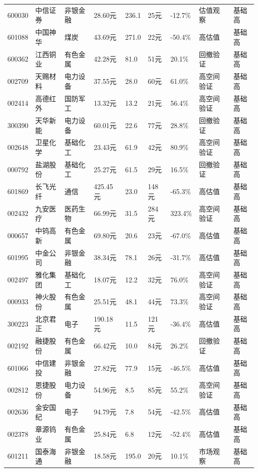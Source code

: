 \begin{longtable}{L{1.0cm}L{1.55cm}L{1.4cm}R{1.0cm}R{1.0cm}R{1.0cm}R{1.05cm}L{3.6cm}L{0.9cm}}
600030 & 中信证券 & 非银金融 & 28.60元 & 236.1 & 25元 & -12.7\% & 估值观察 & 基础高 \\
601088 & 中国神华 & 煤炭 & 43.69元 & 271.0 & 22元 & -50.4\% & 高估值 & 基础高 \\
600362 & 江西铜业 & 有色金属 & 42.28元 & 81.0 & 51元 & 20.1\% & 回撤验证 & 基础高 \\
002709 & 天赐材料 & 电力设备 & 37.55元 & 28.0 & 60元 & 61.0\% & 高空间验证 & 基础高 \\
002414 & 高德红外 & 国防军工 & 13.32元 & 13.2 & 21元 & 56.4\% & 高空间验证 & 基础高 \\
300390 & 天华新能 & 电力设备 & 60.01元 & 22.6 & 77元 & 28.8\% & 回撤验证 & 基础高 \\
002648 & 卫星化学 & 基础化工 & 23.43元 & 61.9 & 42元 & 80.9\% & 高空间验证 & 基础高 \\
000792 & 盐湖股份 & 基础化工 & 25.27元 & 61.5 & 29元 & 16.5\% & 回撤验证 & 基础高 \\
601869 & 长飞光纤 & 通信 & 425.45元 & 23.0 & 148元 & -65.3\% & 高估值 & 基础高 \\
002432 & 九安医疗 & 医药生物 & 66.99元 & 31.5 & 284元 & 323.4\% & 高空间验证 & 基础高 \\
000657 & 中钨高新 & 有色金属 & 69.80元 & 20.6 & 23元 & -67.0\% & 高估值 & 基础高 \\
601995 & 中金公司 & 非银金融 & 38.34元 & 78.1 & 26元 & -31.7\% & 高估值 & 基础高 \\
002497 & 雅化集团 & 基础化工 & 18.07元 & 12.2 & 32元 & 76.0\% & 高空间验证 & 基础高 \\
000933 & 神火股份 & 有色金属 & 25.51元 & 48.1 & 44元 & 73.3\% & 高空间验证 & 基础高 \\
300223 & 北京君正 & 电子 & 190.18元 & 11.5 & 121元 & -36.4\% & 高估值 & 基础高 \\
002192 & 融捷股份 & 有色金属 & 66.42元 & 10.0 & 84元 & 26.2\% & 回撤验证 & 基础高 \\
601066 & 中信建投 & 非银金融 & 27.82元 & 77.9 & 15元 & -46.5\% & 高估值 & 基础高 \\
002812 & 恩捷股份 & 电力设备 & 54.96元 & 8.5 & 85元 & 55.2\% & 高空间验证 & 基础高 \\
002636 & 金安国纪 & 电子 & 94.79元 & 7.8 & 54元 & -42.5\% & 高估值 & 基础高 \\
002378 & 章源钨业 & 有色金属 & 25.84元 & 6.8 & 12元 & -52.4\% & 高估值 & 基础高 \\
601211 & 国泰海通 & 非银金融 & 18.58元 & 195.0 & 20元 & 10.1\% & 市场观察 & 基础高 \\

\end{longtable}
